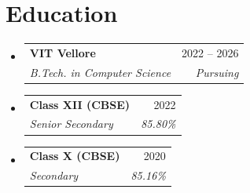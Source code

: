 \documentclass[letterpaper,10pt]{article}
\makeatletter
\newcommand{\resumeSubheading}[4]{
  \vspace{1pt}\item
  \begin{tabular*}{0.98\textwidth}[t]{l@{\extracolsep{\fill}}r}
    \textbf{#1} & #2 \\
    \textit{\small #3} & \textit{\small #4} \\
  \end{tabular*}\vspace{-5pt}
}
\newcommand{\resumeSubHeadingListStart}{\begin{itemize}[leftmargin=0.0in, label={}]}
\newcommand{\resumeSubHeadingListEnd}{\end{itemize}}
\makeatother
\begin{document}
\section{Education}
\resumeSubHeadingListStart
  \resumeSubheading
    {VIT Vellore}{2022 -- 2026}
    {B.Tech. in Computer Science}{Pursuing}
  \resumeSubheading
    {Class XII (CBSE)}{2022}
    {Senior Secondary}{85.80\%}
  \resumeSubheading
    {Class X (CBSE)}{2020}
    {Secondary}{85.16\%}
\resumeSubHeadingListEnd
\end{document}
